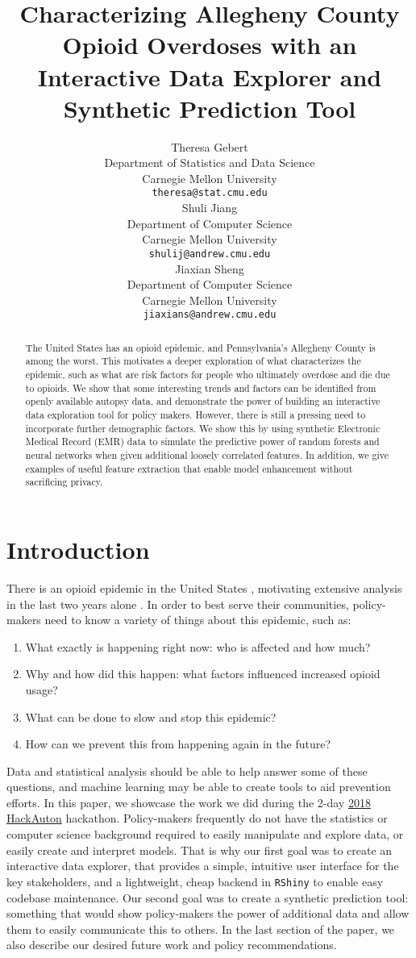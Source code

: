 \documentclass{article}
\title{Characterizing Allegheny County Opioid Overdoses with an Interactive Data Explorer and Synthetic Prediction Tool}
\author{
  Theresa Gebert\\
  Department of Statistics and Data Science\\
  Carnegie Mellon University\\
  \texttt{theresa@stat.cmu.edu} \\
  \And
  Shuli Jiang \\
  Department of Computer Science\\
  Carnegie Mellon University\\
  \texttt{shulij@andrew.cmu.edu} \\
  \AND
  Jiaxian Sheng \\
  Department of Computer Science\\
  Carnegie Mellon University\\
  \texttt{jiaxians@andrew.cmu.edu} \\
}
\begin{document}

\maketitle

\begin{abstract}
The United States has an opioid epidemic, and Pennsylvania's Allegheny County is among the worst. This motivates a deeper exploration of what characterizes the epidemic, such as what are risk factors for people who ultimately overdose and die due to opioids. We show that some interesting trends and factors can be identified from openly available autopsy data, and demonstrate the power of building an interactive data exploration tool for policy makers. However, there is still a pressing need to incorporate further demographic factors. We show this by using synthetic Electronic Medical Record (EMR) data to simulate the predictive power of random forests and neural networks when given additional loosely correlated features. In addition, we give examples of useful feature extraction that enable model enhancement without sacrificing privacy.
\end{abstract}

\section{Introduction}
There is an opioid epidemic in the United States \citep{alexander15}, motivating extensive analysis in the last two years alone \citep{sankaran16, chen17, neill17, battista17}. In order to best serve their communities, policy-makers need to know a variety of things about this epidemic, such as:
\begin{enumerate}
\item What exactly is happening right now: who is affected and how much?
\item Why and how did this happen: what factors influenced increased opioid usage?
\item What can be done to slow and stop this epidemic?
\item How can we prevent this from happening again in the future?
\end{enumerate}
Data and statistical analysis should be able to help answer some of these questions, and machine learning may be able to create tools to aid prevention efforts. In this paper, we showcase the work we did during the 2-day \href{https://www.hackauton.com/}{2018 HackAuton} hackathon. Policy-makers frequently do not have the statistics or computer science background required to easily manipulate and explore data, or easily create and interpret models. That is why our first goal was to create an interactive data explorer, that provides a simple, intuitive user interface for the key stakeholders, and a lightweight, cheap backend in \texttt{RShiny} to enable easy codebase maintenance. Our second goal was to create a synthetic prediction tool: something that would show policy-makers the power of additional data and allow them to easily communicate this to others. In the last section of the paper, we also describe our desired future work and policy recommendations.
\end{document}
